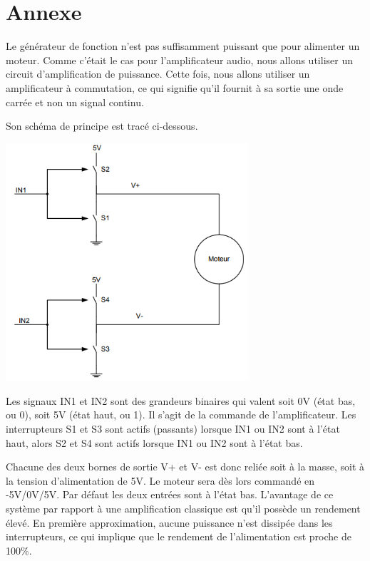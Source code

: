 \documentclass{../template/labo}
\begin{document}




\section{Annexe}
Le générateur de fonction n'est pas suffisamment puissant que pour alimenter un moteur. Comme c'était le cas
pour l'amplificateur audio, nous allons utiliser un circuit d'amplification de puissance.
Cette fois, nous allons utiliser un amplificateur à commutation, ce qui signifie qu'il fournit à sa sortie une onde
carrée et non un signal continu.


Son schéma de principe est tracé ci-dessous.

\begin{center}
\includegraphics[width=9cm]{sch10}
\end{center}

Les signaux IN1 et IN2 sont des grandeurs binaires qui valent soit 0V (état bas, ou 0), soit 5V (état haut, ou 1). Il
s'agit de la commande de l'amplificateur.
Les interrupteurs S1 et S3 sont actifs (passants) lorsque IN1 ou IN2 sont à l'état haut, alors S2 et S4 sont actifs
lorsque IN1 ou IN2 sont à l'état bas.


Chacune des deux bornes de sortie V+ et V- est donc reliée soit à la masse, soit à la tension d'alimentation de
5V. Le moteur sera dès lors commandé en -5V/0V/5V. Par défaut les deux entrées sont à l'état bas.
L'avantage de ce système par rapport à une amplification classique est qu'il possède un rendement élevé. En
première approximation, aucune puissance n'est dissipée dans les interrupteurs, ce qui implique que le
rendement de l'alimentation est proche de 100\%.
\end{document}

